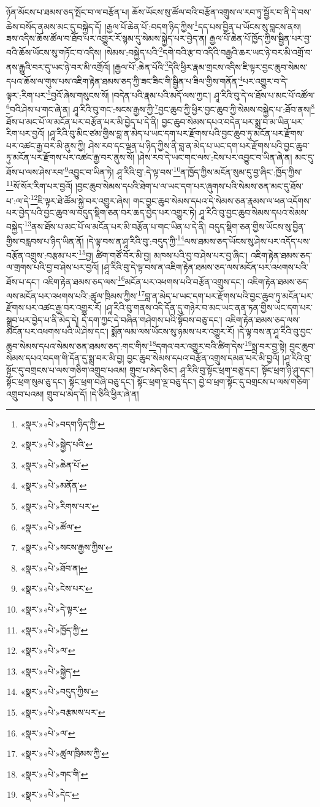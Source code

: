 ཉོན་མོངས་པ་ཐམས་ཅད་སྤོང་བ་ལ་བརྩོན་པ། ཆོས་ཡོངས་སུ་ཚོལ་བའི་བརྩོན་འགྲུས་ལ་རབ་ཏུ་སྦྱོར་བ་ནི་དེ་བས་ཆེས་བསོད་ནམས་མང་དུ་བསྐྱེད་དོ། །རྒྱལ་པོ་ཆེན་པོ་:བདག་ཉིད་ཀྱིས་\footnote{«སྣར་»«པེ་»བདག་ཉིད་ཀྱི་}དད་པས་བྱིན་པ་ཡོངས་སུ་བླངས་ནས། ཟས་འདིས་ཆོས་ཚོལ་བ་ཐོབ་པར་འགྱུར་རོ་སྙམ་དུ་སེམས་སྐྱེད་པར་བྱེད་ན། རྒྱལ་པོ་ཆེན་པོ་ཁྱོད་ཀྱིས་སྦྱིན་པར་བྱ་བའི་ཆོས་ཡོངས་སུ་གཏོང་བ་འདིས། །སེམས་:བསྐྱེད་པའི་\footnote{«སྣར་»«པེ་»སྐྱེད་པའི་}དགེ་བའི་རྩ་བ་འདིའི་བརྒྱའི་ཆར་ཡང་ཉེ་བར་མི་འགྲོ་བ་ནས་རྒྱུའི་བར་དུ་ཡང་ཉེ་བར་མི་འགྲོའོ། །རྒྱལ་པོ་:ཆེན་པོའི་\footnote{«སྣར་»«པེ་»ཆེན་པོ་}དེའི་ཕྱིར་རྣམ་གྲངས་འདིས་ཇི་ལྟར་བྱང་ཆུབ་སེམས་དཔའ་ཆོས་ལ་གུས་པས་འཇིག་རྟེན་ཐམས་ཅད་ཀྱི་ཟང་ཟིང་གི་སྦྱིན་པ་ཟིལ་གྱིས་གནོན་\footnote{«སྣར་»«པེ་»མནོན་}པར་འགྱུར་བ་དེ་ལྟར་:རིག་པར་\footnote{«སྣར་»«པེ་»རིགས་པར་}བྱའོ་ཞེས་གསུངས་སོ། །བདེན་པའི་རྣམ་པའི་མདོ་ལས་ཀྱང་། ཤཱ་རིའི་བུ་དེ་ལ་ཐོས་པ་མང་པོ་འཚོལ་\footnote{«སྣར་»«པེ་»ཚོལ་}བའི་ཤེས་པ་གང་ཞེ་ན། ཤཱ་རིའི་བུ་གང་:སངས་རྒྱས་ཀྱི་\footnote{«སྣར་»«པེ་»སངས་རྒྱས་ཀྱིས་}བྱང་ཆུབ་ཀྱི་ཕྱིར་བྱང་ཆུབ་ཀྱི་སེམས་བསྐྱེད་པ་:ཐོབ་ནས།\footnote{«སྣར་»«པེ་»ཐོབ་ན།} ཐོས་པ་མང་པོ་ལ་མངོན་པར་བརྩོན་པར་མི་བྱེད་པ་དེ་ནི། བྱང་ཆུབ་སེམས་དཔའ་བདེན་པར་སྨྲ་བ་མ་ཡིན་པར་རིག་པར་བྱའོ། །ཤཱ་རིའི་བུ་མིང་ཙམ་གྱིས་བླ་ན་མེད་པ་ཡང་དག་པར་རྫོགས་པའི་བྱང་ཆུབ་ཏུ་མངོན་པར་རྫོགས་པར་འཚང་རྒྱ་བར་མི་ནུས་ཀྱི། ཤེས་རབ་དང་ལྡན་པ་ཉིད་ཀྱིས་ནི་བླ་ན་མེད་པ་ཡང་དག་པར་རྫོགས་པའི་བྱང་ཆུབ་ཏུ་མངོན་པར་རྫོགས་པར་འཚང་རྒྱ་བར་ནུས་སོ། །ཤེས་རབ་དེ་ཡང་གང་ལས་:ངེས་པར་འབྱུང་བ་ཡིན་ཞེ་ན། མང་དུ་ཐོས་པ་ལས་ཤེས་རབ་\footnote{«སྣར་»«པེ་»ངེས་པར་}འབྱུང་བ་ཡིན་ཏེ། ཤཱ་རིའི་བུ་:དེ་ལྟ་བས་\footnote{«སྣར་»«པེ་»དེ་ལྟར་}ན་ཁྱོད་ཀྱིས་མངོན་སུམ་དུ་བྱ་ཞིང་:ཁྱོད་ཀྱིས་\footnote{«སྣར་»«པེ་»ཁྱོད་ཀྱི་}སོ་སོར་རིག་པར་བྱའོ། །བྱང་ཆུབ་སེམས་དཔའི་ཐེག་པ་ལ་ཡང་དག་པར་ཞུགས་པའི་སེམས་ཅན་མང་དུ་ཐོས་པ་:ལ་དེ་\footnote{«སྣར་»«པེ་»ལ་}ཇི་ལྟར་ཐེ་ཚོམ་སྐྱེ་བར་འགྱུར་ཞེས། གང་བྱང་ཆུབ་སེམས་དཔའ་དེ་སེམས་ཅན་རྣམས་ལ་ཕན་འདོགས་པར་བྱེད་པའི་བྱང་ཆུབ་ལ་བདུད་སྡིག་ཅན་བར་ཆད་བྱེད་པར་འགྱུར་ཏེ། ཤཱ་རིའི་བུ་བྱང་ཆུབ་སེམས་དཔའ་སེམས་བསྐྱེད་\footnote{«སྣར་»«པེ་»སྐྱེད་}ནས་ཐོས་པ་མང་པོ་ལ་མངོན་པར་མི་བརྩོན་པ་གང་ཡིན་པ་དེ་ནི། བདུད་སྡིག་ཅན་གྱིས་ཡོངས་སུ་བྱིན་གྱིས་བརླབས་པ་ཉིད་ཡིན་ནོ། །དེ་ལྟ་བས་ན་ཤཱ་རིའི་བུ་:བདུད་ཀྱི་\footnote{«སྣར་»«པེ་»བདུད་ཀྱིས་}ལས་ཐམས་ཅད་ཡོངས་སུ་ཤེས་པར་འདོད་པས་བརྩོན་འགྲུས་:བརྩམ་པར་\footnote{«སྣར་»«པེ་»བརྩམས་པར་}བྱ། ཚིག་གཙོ་བོར་མི་བྱ། མཁས་པའི་བྱ་བ་ཤེས་པར་བྱ་ཞིང་། འཇིག་རྟེན་ཐམས་ཅད་ལ་གྲགས་པའི་བྱ་བ་ཤེས་པར་བྱའོ། །ཤཱ་རིའི་བུ་དེ་ལྟ་བས་ན་འཇིག་རྟེན་ཐམས་ཅད་ལས་མངོན་པར་འཕགས་པའི་ཐོས་པ་དང་། འཇིག་རྟེན་ཐམས་ཅད་ལས་\footnote{«སྣར་»«པེ་»ལ་}མངོན་པར་འཕགས་པའི་བརྩོན་འགྲུས་དང་། འཇིག་རྟེན་ཐམས་ཅད་ལས་མངོན་པར་འཕགས་པའི་:ཚུལ་ཁྲིམས་ཀྱིས་\footnote{«སྣར་»«པེ་»ཚུལ་ཁྲིམས་ཀྱི་}བླ་ན་མེད་པ་ཡང་དག་པར་རྫོགས་པའི་བྱང་ཆུབ་ཏུ་མངོན་པར་རྫོགས་པར་འཚང་རྒྱ་བར་འགྱུར་རོ། །ཤཱ་རིའི་བུ་གནས་འདི་དོན་དུ་གཉེར་བ་མང་ཡང་ནན་ཏན་གྱིས་ཡང་དག་པར་སྒྲུབ་པར་བྱེད་པ་ནི་མེད་དེ། དེ་དག་ཀྱང་དེ་བཞིན་གཤེགས་པའི་སྟོབས་བཅུ་དང་། འཇིག་རྟེན་ཐམས་ཅད་ལས་མངོན་པར་འཕགས་པའི་ཡེ་ཤེས་དང་། སྨོན་ལམ་ལས་ཡོངས་སུ་ཉམས་པར་འགྱུར་རོ། །དེ་ལྟ་བས་ན་ཤཱ་རིའི་བུ་བྱང་ཆུབ་སེམས་དཔའ་སེམས་ཅན་ཐམས་ཅད་:གང་གིས་\footnote{«སྣར་»«པེ་»གང་གི་}དགའ་བར་འགྱུར་བའི་ཚིག་དེས་\footnote{«སྣར་»«པེ་»དེང་}སྨྲ་བར་བྱ་སྟེ། བྱང་ཆུབ་སེམས་དཔའ་བདག་གི་དོན་དུ་སྨྲ་བར་མི་བྱ། བྱང་ཆུབ་སེམས་དཔའ་བརྩོན་འགྲུས་དམན་པར་མི་བྱའོ། །ཤཱ་རིའི་བུ་སྟོང་དུ་བགྲངས་པ་ལས་གཅིག་འགྲུབ་པའམ། གྲུབ་པ་མེད་ཅིང་། ཤཱ་རིའི་བུ་སྟོང་ཕྲག་བཅུ་དང་། སྟོང་ཕྲག་ཉི་ཤུ་དང་། སྟོང་ཕྲག་སུམ་ཅུ་དང་། སྟོང་ཕྲག་བཞི་བཅུ་དང་། སྟོང་ཕྲག་ལྔ་བཅུ་དང་། བྱེ་བ་ཕྲག་སྟོང་དུ་བགྲངས་པ་ལས་གཅིག་འགྲུབ་པའམ། གྲུབ་པ་མེད་དོ། །དེ་ཅིའི་ཕྱིར་ཞེ་ན། 